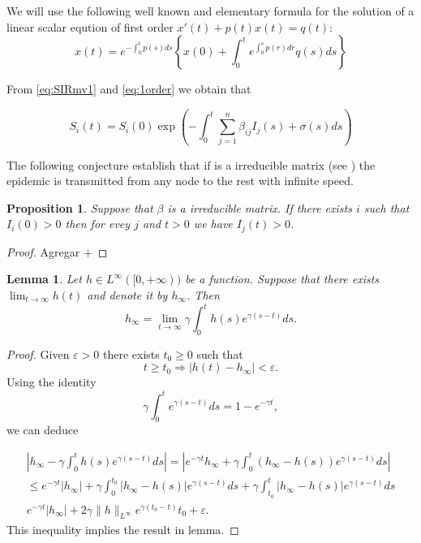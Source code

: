 \documentclass[a4paper,10pt]{article}
\newtheorem{lem}[thm]{Lemma}
\newtheorem{prop}[thm]{Proposition}
\theoremstyle{remark}
\begin{document}
We will use the following well known and elementary formula for the solution of a linear scalar eqution of first order $x'(t)+p(t)x(t)=q(t)$:
\begin{equation}\label{eq:1order}
 x(t)=e^{-\int_0^tp(s)ds}\left\{x(0)+\int_0^t e^{\int_0^sp(r)dr}q(s) ds \right\}
\end{equation}

From  \eqref{eq:SIRmv1} and \eqref{eq:1order} we obtain that

\[
 S_i(t)=S_i(0)
 \exp\left(
    -\int_0^t\sum\limits_{j=1}^{n} \beta_{i j} I_{j}(s)+\sigma(s)ds
    \right)
\]



The following conjecture establish that if is a irreducible matrix (see \cite{CarlD.Meyer538}) the epidemic is transmitted from any node to the rest with infinite speed.


\begin{prop} Suppose that $\beta$ is a irreducible matrix. If there exists $i$ such that $I_i(0)>0$ then for evey $j$ and $t>0$ we have $I_j(t)>0$.
 
\end{prop}
 
\begin{proof} Agregar
 +
\end{proof}

\begin{lem}\label{lem:lim-weak} Let $h\in L^{\infty}([0,+\infty))$ be a function. Suppose that there exists  $\lim_{t\to\infty}h(t)$ and denote it by $h_{\infty}$. Then
\begin{equation}\label{eq:lim-weak}
 h_{\infty}=\lim_{t\to\infty}\gamma\int_0^th(s)e^{\gamma (s-t)}ds.
\end{equation}
\end{lem}
\begin{proof} Given $\varepsilon>0$ there exists $t_0\geq 0$ such that 
\[
 t\geq t_0\Rightarrow |h(t)-h_{\infty}|<\varepsilon.
\]
Using the identity
\[
 \gamma\int_0^te^{\gamma (s-t)}ds=1-e^{-\gamma t},
\]
we can deduce

 \begin{multline*}
  \left|h_{\infty}-\gamma\int_0^th(s)e^{\gamma (s-t)}ds\right|=
  \left|e^{-\gamma t}h_{\infty}+ \gamma\int_0^t\left(h_{\infty}-h(s)\right)e^{\gamma (s-t)}ds \right|\\
  \leq e^{-\gamma t}|h_{\infty}|+  \gamma\int_0^{t_0} \left|h_{\infty}-h(s)\right| e^{\gamma (s-t)}ds +\gamma\int_{t_0}^{t} \left|h_{\infty}-h(s)\right| e^{\gamma (s-t)}ds\\
  e^{-\gamma t}|h_{\infty}|+2\gamma\|h\|_{L^{\infty}}e^{\gamma(t_0-t)}t_0+\varepsilon.
 \end{multline*}
This inequality implies the result in lemma.
\end{proof}
\end{document}
